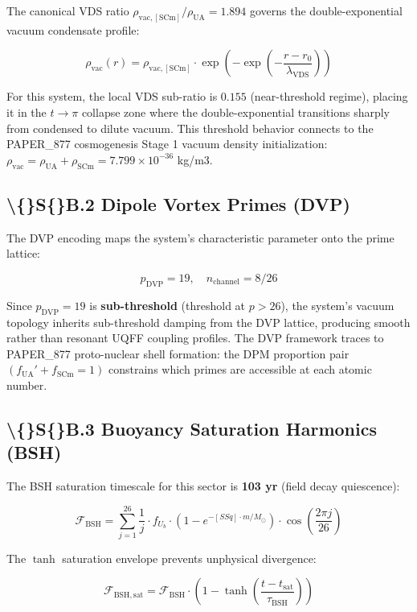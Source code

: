\documentclass[11pt]{article}
\begin{document}
The canonical VDS ratio $\rho_{\mathrm{vac,[SCm]}} / \rho_{\mathrm{UA}} = 1.894$ governs the double-exponential vacuum condensate profile:

$$\rho_{\mathrm{vac}}(r) = \rho_{\mathrm{vac,[SCm]}} \cdot \exp\!\left(-\exp\!\left(-\frac{r - r_0}{\lambda_{\mathrm{VDS}}}\right)\right)$$

For this system, the local VDS sub-ratio is $0.155$ (near-threshold regime), placing it in the $t \to \pi$ collapse zone where the double-exponential transitions sharply from condensed to dilute vacuum. This threshold behavior connects to the PAPER\_877 cosmogenesis Stage 1 vacuum density initialization: $\rho_{\mathrm{vac}} = \rho_{\mathrm{UA}} + \rho_{\mathrm{SCm}} = 7.799 \times 10^{-36}$ kg/m3.

\subsection*{\textbackslash\{\}S\{\}B.2 Dipole Vortex Primes (DVP)}

The DVP encoding maps the system's characteristic parameter onto the prime lattice:

$$p_{\mathrm{DVP}} = 19, \quad n_{\mathrm{channel}} = 8/26$$

Since $p_{\mathrm{DVP}} = 19$ is \textbf{sub-threshold} (threshold at $p > 26$), the system's vacuum topology inherits sub-threshold damping from the DVP lattice, producing smooth rather than resonant UQFF coupling profiles. The DVP framework traces to PAPER\_877 proto-nuclear shell formation: the DPM proportion pair $(f_{\mathrm{UA}}' + f_{\mathrm{SCm}} = 1)$ constrains which primes are accessible at each atomic number.

\subsection*{\textbackslash\{\}S\{\}B.3 Buoyancy Saturation Harmonics (BSH)}

The BSH saturation timescale for this sector is \textbf{103 yr} (field decay quiescence):

$$\mathcal{F}_{\mathrm{BSH}} = \sum_{j=1}^{26} \frac{1}{j} \cdot f_U_b \cdot \left(1 - e^{-[SSq] \cdot m/M_\odot}\right) \cdot \cos\!\left(\frac{2\pi j}{26}\right)$$

The $\tanh$ saturation envelope prevents unphysical divergence:

$$\mathcal{F}_{\mathrm{BSH,sat}} = \mathcal{F}_{\mathrm{BSH}} \cdot \left(1 - \tanh\!\left(\frac{t - t_{\mathrm{sat}}}{\tau_{\mathrm{BSH}}}\right)\right)$$
\end{document}
